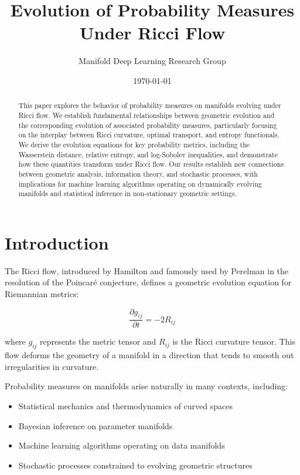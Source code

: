 \documentclass[12pt,a4paper]{article}
\title{Evolution of Probability Measures Under Ricci Flow}
\author{Manifold Deep Learning Research Group}
\date{\today}
\begin{document}
\maketitle

\begin{abstract}
This paper explores the behavior of probability measures on manifolds evolving under Ricci flow. We establish fundamental relationships between geometric evolution and the corresponding evolution of associated probability measures, particularly focusing on the interplay between Ricci curvature, optimal transport, and entropy functionals. We derive the evolution equations for key probability metrics, including the Wasserstein distance, relative entropy, and log-Sobolev inequalities, and demonstrate how these quantities transform under Ricci flow. Our results establish new connections between geometric analysis, information theory, and stochastic processes, with implications for machine learning algorithms operating on dynamically evolving manifolds and statistical inference in non-stationary geometric settings.
\end{abstract}

\section{Introduction}

The Ricci flow, introduced by Hamilton \cite{hamilton1982} and famously used by Perelman \cite{perelman2002entropy} in the resolution of the Poincaré conjecture, defines a geometric evolution equation for Riemannian metrics:

\begin{equation}
\frac{\partial g_{ij}}{\partial t} = -2R_{ij}
\end{equation}

\noindent where $g_{ij}$ represents the metric tensor and $R_{ij}$ is the Ricci curvature tensor. This flow deforms the geometry of a manifold in a direction that tends to smooth out irregularities in curvature.

Probability measures on manifolds arise naturally in many contexts, including:
\begin{itemize}
    \item Statistical mechanics and thermodynamics of curved spaces
    \item Bayesian inference on parameter manifolds
    \item Machine learning algorithms operating on data manifolds
    \item Stochastic processes constrained to evolving geometric structures
\end{itemize}
\end{document}
